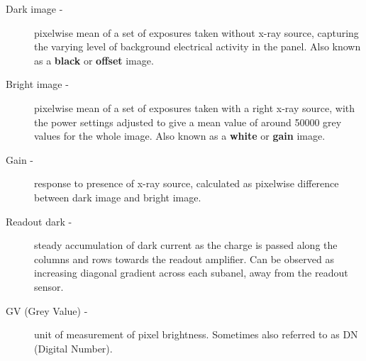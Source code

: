 \documentclass[\main/IO-Pixels.tex]{subfiles}
\begin{document}
\begin{description}

\item[Dark image -] pixelwise mean of a set of exposures taken without x-ray source, capturing  the varying level of background electrical activity in the panel. Also known as a \textbf{black} or \textbf{offset} image.

\item[Bright image -] pixelwise mean of a set of exposures taken with a right x-ray source, with the power settings adjusted to give a mean value of around 50000 grey values  for the whole image. Also known as a \textbf{white} or \textbf{gain} image.

\item[Gain -] response to presence of x-ray source, calculated as pixelwise difference between dark image and bright image.

\item[Readout dark -] steady accumulation of dark current as the charge is passed along the columns and rows towards the readout amplifier. Can be observed as increasing diagonal gradient across each subanel, away from the readout sensor.

\item[GV (Grey Value) -] unit of measurement of pixel brightness. Sometimes also referred to as DN (Digital Number).

\end{description}
\end{document}
